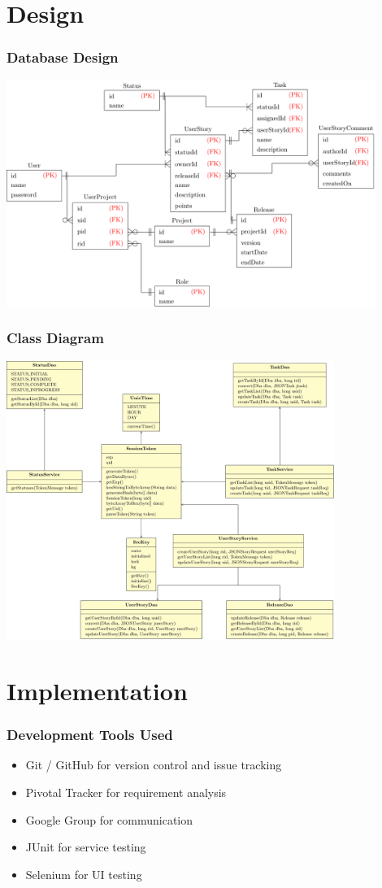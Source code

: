 \documentclass[final]{beamer}
\begin{document}
\section{Design}

\begin{frame}
	\frametitle{Database Design}
	\includegraphics[width = 0.9\textwidth]{./database}
\end{frame}

\begin{frame}
	\frametitle{Class Diagram}
	\includegraphics[width = 0.8\textwidth]{./classdiagram-presentation}
\end{frame}


\section{Implementation}

\begin{frame}
	\frametitle{Development Tools Used}
	\begin{beamerboxesrounded}[shadow]{}
		\begin{itemize}
			\item{Git / GitHub for version control and issue tracking}
			\item{Pivotal Tracker for requirement analysis}
			\item{Google Group for communication}
			\item{JUnit for service testing}
			\item{Selenium for UI testing}
		\end{itemize}
	\end{beamerboxesrounded}
\end{frame}
\end{document}
